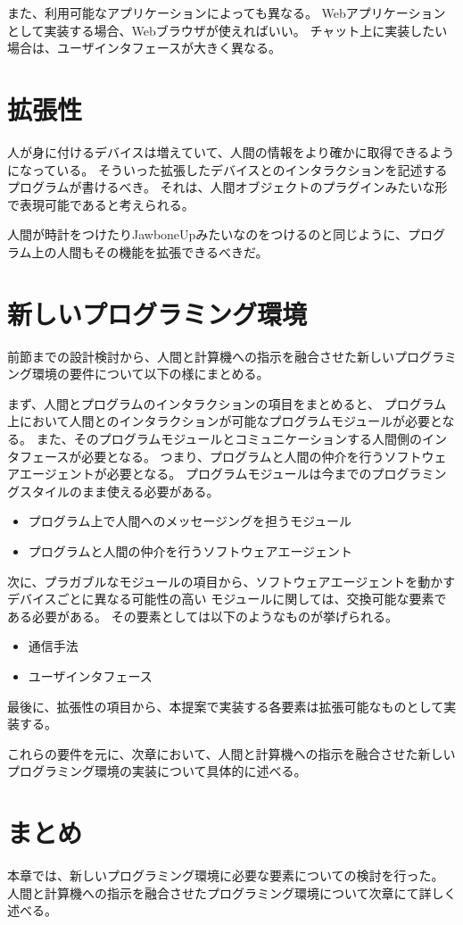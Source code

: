 また、利用可能なアプリケーションによっても異なる。
Webアプリケーションとして実装する場合、Webブラウザが使えればいい。
チャット上に実装したい場合は、ユーザインタフェースが大きく異なる。

\section{拡張性}\label{ux62e1ux5f35ux6027}

人が身に付けるデバイスは増えていて、人間の情報をより確かに取得できるようになっている。
そういった拡張したデバイスとのインタラクションを記述するプログラムが書けるべき。
それは、人間オブジェクトのプラグインみたいな形で表現可能であると考えられる。

人間が時計をつけたりJawboneUpみたいなのをつけるのと同じように、プログラム上の人間もその機能を拡張できるべきだ。

\section{新しいプログラミング環境}\label{ux65b0ux3057ux3044ux30d7ux30edux30b0ux30e9ux30dfux30f3ux30b0ux74b0ux5883}

前節までの設計検討から、人間と計算機への指示を融合させた新しいプログラミング環境の要件について以下の様にまとめる。

まず、人間とプログラムのインタラクションの項目をまとめると、
プログラム上において人間とのインタラクションが可能なプログラムモジュールが必要となる。
また、そのプログラムモジュールとコミュニケーションする人間側のインタフェースが必要となる。
つまり、プログラムと人間の仲介を行うソフトウェアエージェントが必要となる。
プログラムモジュールは今までのプログラミングスタイルのまま使える必要がある。

\begin{itemize}
\itemsep1pt\parskip0pt
\item
  プログラム上で人間へのメッセージングを担うモジュール
\item
  プログラムと人間の仲介を行うソフトウェアエージェント
\end{itemize}

次に、プラガブルなモジュールの項目から、ソフトウェアエージェントを動かすデバイスごとに異なる可能性の高い
モジュールに関しては、交換可能な要素である必要がある。
その要素としては以下のようなものが挙げられる。

\begin{itemize}
\itemsep1pt\parskip0pt
\item
  通信手法
\item
  ユーザインタフェース
\end{itemize}

最後に、拡張性の項目から、本提案で実装する各要素は拡張可能なものとして実装する。

これらの要件を元に、次章において、人間と計算機への指示を融合させた新しいプログラミング環境の実装について具体的に述べる。

\section{まとめ}\label{ux307eux3068ux3081}

本章では、新しいプログラミング環境に必要な要素についての検討を行った。
人間と計算機への指示を融合させたプログラミング環境について次章にて詳しく述べる。
